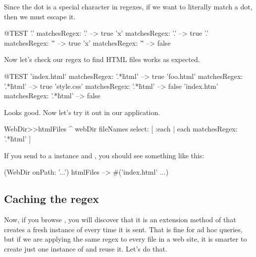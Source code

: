 \documentclass[a4paper,10pt,twoside]{book}
\begin{document}
Since the dot is a special character in regexes, if we want to literally match a dot, then we must escape it.

\begin{code}{@TEST}
'.' matchesRegex: '.'   --> true
'x' matchesRegex: '.'  --> true
'.' matchesRegex: '\.'  --> true
'x' matchesRegex: '\.' --> false
\end{code}

Now let's check our regex to find HTML files works as expected.

\begin{code}{@TEST}
'index.html' matchesRegex: '.*\.html' --> true
'foo.html' matchesRegex: '.*\.html'    --> true
'style.css' matchesRegex: '.*\.html'   --> false
'index.htm' matchesRegex: '.*\.html' --> false
\end{code}

Looks good. Now let's try it out in our application.


\begin{code}{}
WebDir>>htmlFiles
	^ webDir fileNames select: [ :each | each matchesRegex: '.*\.html' ]
\end{code}

If you send  to a  instance and , you should see something like this:

\begin{code}{}
(WebDir onPath: '...') htmlFiles --> #('index.html' ...)
\end{code}

\subsection{Caching the regex}

Now, if you browse , you will discover that it is an extension method of  that creates a fresh instance of  every time it is sent.  That is fine for ad hoc queries, but if we are applying the same regex to every file in a web site, it is smarter to create just one instance of  and reuse it. Let's do that.

\end{document}
